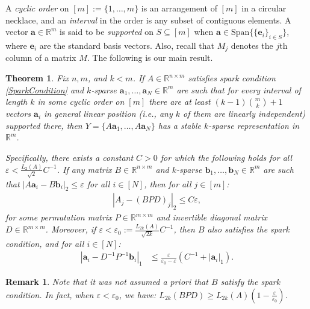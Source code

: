 \documentclass[journal, twocolumn]{IEEEtran}
\newtheorem{theorem}{Theorem}
\newtheorem{remark}{Remark}
\begin{document}
A \textit{cyclic order} on $[m] := \{1, \ldots,m\}$ is an arrangement of $[m]$ in a circular necklace, and an \textit{interval} in the order is any subset of contiguous elements. A vector $\mathbf{a} \in \mathbb{R}^m$ is said to be \emph{supported} on $S \subseteq [m]$ when $\mathbf{a} \in \text{Span}\{ \{\mathbf{e}_i\}_{i\in S}\}$, where $\mathbf{e}_i$ are the standard basis vectors.  Also, recall that $M_j$ denotes the $j$th column of a matrix $M$. The following is our main result.

\begin{theorem}\label{DeterministicUniquenessTheorem}
Fix $n, m$, and $k < m$. If $A \in \mathbb{R}^{n \times m}$ satisfies spark condition \eqref{SparkCondition} and $k$-sparse \mbox{$\mathbf{a}_1, \ldots, \mathbf{a}_N \in \mathbb{R}^m$} are such that for every interval of length $k$ in some cyclic order on $[m]$ there are at least \mbox{$(k-1){m \choose k}+1$} vectors $\mathbf{a}_i$ in general linear position (i.e., any $k$ of them are linearly independent) supported there, then $Y = \{A\mathbf{a}_1, \ldots, A\mathbf{a}_N\}$ has a stable $k$-sparse representation in $\mathbb{R}^m$.

Specifically, there exists a constant $C > 0$ for which the following holds for all $\varepsilon < \frac{L_2(A)}{\sqrt{2}}C^{-1}$. If any matrix $B \in \mathbb{R}^{n \times m}$ and $k$-sparse $\mathbf{b}_1, \ldots, \mathbf{b}_N \in \mathbb{R}^m$ are such that \mbox{$|A\mathbf{a}_i - B\mathbf{b}_i|_2 \leq \varepsilon$} for all $i \in [N]$, then for all $j \in [m]$:
\begin{align}\label{Cstable}
|A_j-(BPD)_j|_2 \leq C\varepsilon,
\end{align}
%
for some permutation matrix $P \in \mathbb{R}^{m \times m}$ and invertible diagonal matrix $D \in \mathbb{R}^{m \times m}$.  Moreover, if $\varepsilon < \varepsilon_0 := \frac{L_{2k}(A)}{\sqrt{2k}}C^{-1}$, then $B$ also satisfies the spark condition, and for all $i \in [N]$:
\begin{align}\label{b-PDa}
|\mathbf{a}_i - D^{-1}P^{-1}\mathbf{b}_i|_1 &\leq \frac{\varepsilon }{ \varepsilon_0 - \varepsilon} \left( C^{-1}+|\mathbf{a}_i|_1 \right).
\end{align}
\end{theorem}

\begin{remark}
Note that it was not assumed a priori that $B$ satisfy the spark condition. In fact, when $\varepsilon < \varepsilon_0$, we have:
$L_{2k}(BPD) \geq L_{2k}(A)\left( 1 - \frac{\varepsilon}{\varepsilon_0} \right)$.
\end{remark}
\end{document}
